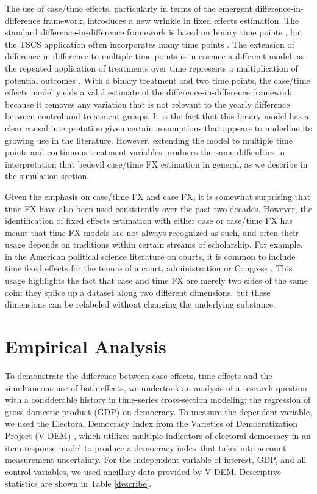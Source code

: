 \documentclass{article}[12pt]
\begin{document}
The use of case/time effects, particularly in terms of the emergent difference-in-difference framework, introduces a new wrinkle in fixed effects estimation. The standard difference-in-difference framework is based on binary time points \parencite{shahidur2010}, but the TSCS application often incorporates many time points \parencite{scheve2012}. The extension of difference-in-difference to multiple time points is in essence a different model, as the repeated application of treatments over time represents a multiplication of potential outcomes \parencite{imai2016}. With a binary treatment and two time points, the case/time effects model yields a valid estimate of the difference-in-difference framework because it removes any variation that is not relevant to the yearly difference between control and treatment groups. It is the fact that this binary model has a clear causal interpretation given certain assumptions that appears to underline its growing use in the literature. However, extending the model to multiple time points and continuous treatment variables produces the same difficulties in interpretation that bedevil case/time FX estimation in general, as we describe in the simulation section. 

Given the emphasis on case/time FX and case FX, it is somewhat surprising that time FX have also been used consistently over the past two decades. However, the identification of fixed effects estimation with either case or case/time FX has meant that time FX models are not always recognized as such, and often their usage depends on traditions within certain streams of scholarship. For example, in the American political science literature on courts, it is common to include time fixed effects for the tenure of a court, administration or Congress \parencite{jenkins2012,hall2014,boyd2010,lazarus2009}. This usage highlights the fact that case and time FX are merely two sides of the same coin: they splice up a dataset along two different dimensions, but these dimensions can be relabeled without changing the underlying substance.

\section{Empirical Analysis}

To demonstrate the difference between case effects, time effects and the simultaneous use of both effects, we undertook an analysis of a research question with a considerable history in time-series cross-section modeling: the regression of gross domestic product (GDP) on democracy. To measure the dependent variable, we used the Electoral Democracy Index from the Varieties of Democratization Project (V-DEM) \parencite{vdem2016}, which utilizes multiple indicators of electoral democracy in an item-response model to produce a democracy index that takes into account measurement uncertainty. For the independent variable of interest, GDP, and all control variables, we used ancillary data provided by V-DEM. Descriptive statistics are shown in Table \ref{describe}.
\end{document}
